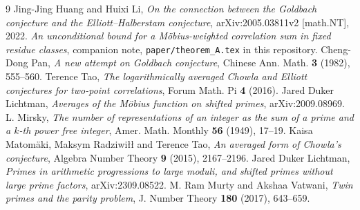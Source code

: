 \documentclass[11pt,a4paper]{article}
\theoremstyle{plain}
\theoremstyle{definition}
\begin{document}
\begin{thebibliography}{9}
 Jing-Jing Huang and Huixi Li, \emph{On the connection
between the Goldbach conjecture and the Elliott--Halberstam
conjecture}, arXiv:2005.03811v2 [math.NT], 2022.
 \emph{An unconditional bound for a M\"obius-weighted
correlation sum in fixed residue classes}, companion note,
\texttt{paper/theorem\_A.tex} in this repository.
 Cheng-Dong Pan, \emph{A new attempt on Goldbach
conjecture}, Chinese Ann. Math. \textbf{3} (1982), 555--560.
 Terence Tao, \emph{The logarithmically averaged Chowla
and Elliott conjectures for two-point correlations}, Forum Math. Pi
\textbf{4} (2016).
 Jared Duker Lichtman, \emph{Averages of the M\"obius
function on shifted primes}, arXiv:2009.08969.
 L. Mirsky, \emph{The number of representations
of an integer as the sum of a prime and a $k$-th power free
integer}, Amer. Math. Monthly \textbf{56} (1949), 17--19.
 Kaisa Matom\"aki, Maksym Radziwi\l{}\l{}
and Terence Tao, \emph{An averaged form of Chowla's conjecture},
Algebra Number Theory \textbf{9} (2015), 2167--2196.
 Jared Duker Lichtman, \emph{Primes in arithmetic
progressions to large moduli, and shifted primes without large prime
factors}, arXiv:2309.08522.
 M. Ram Murty and Akshaa Vatwani, \emph{Twin primes and
the parity problem}, J. Number Theory \textbf{180} (2017), 643--659.
\end{thebibliography}
\end{document}
